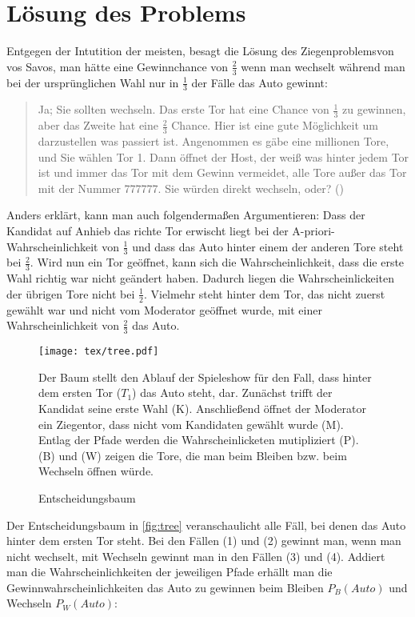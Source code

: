\chapter{Lösung des Problems}

Entgegen der Intutition der meisten, besagt die Lösung des Ziegenproblemsvon vos Savos, man hätte eine Gewinnchance von $\frac{2}{3}$ wenn man wechselt während man bei der ursprünglichen Wahl nur in $\frac{1}{3}$ der Fälle das Auto gewinnt:

\begin{quote}
    Ja; Sie sollten wechseln. Das erste Tor hat eine Chance von $\frac{1}{3}$ zu gewinnen, aber das Zweite hat eine $\frac{2}{3}$ Chance. Hier ist eine gute Möglichkeit um darzustellen was passiert ist. Angenommen es gäbe eine millionen Tore, und Sie wählen Tor 1. Dann öffnet der Host, der weiß was hinter jedem Tor ist und immer das Tor mit dem Gewinn vermeidet, alle Tore außer das Tor mit der Nummer 777777. Sie würden direkt wechseln, oder? (\cite{Savant:1990})
\end{quote}

Anders erklärt, kann man auch folgendermaßen Argumentieren: Dass der Kandidat auf Anhieb das richte Tor erwischt liegt bei der A-priori-Wahrscheinlichkeit von $\frac{1}{3}$ und dass das Auto hinter einem der anderen Tore steht bei $\frac{2}{3}$. Wird nun ein Tor geöffnet, kann sich die Wahrscheinlichkeit, dass die erste Wahl richtig war nicht geändert haben. Dadurch liegen die Wahrscheinlickeiten der übrigen Tore nicht bei $\frac{1}{2}$. Vielmehr steht hinter dem Tor, das nicht zuerst gewählt war und nicht vom Moderator geöffnet wurde, mit einer Wahrscheinlichkeit von $\frac{2}{3}$ das Auto.

\begin{figure}[htbp]
    \centering
    \texttt{[image: tex/tree.pdf]}
    \caption{Entscheidungsbaum}\label{fig:tree}
    \small {Der Baum stellt den Ablauf der Spieleshow für den Fall, dass hinter dem ersten Tor ($T_1$) das Auto steht, dar. Zunächst trifft der Kandidat seine erste Wahl (K). Anschließend öffnet der Moderator ein Ziegentor, dass nicht vom Kandidaten gewählt wurde (M). Entlag der Pfade werden die Wahrscheinlicketen mutipliziert (P). (B) und (W) zeigen die Tore, die man beim Bleiben bzw. beim Wechseln öffnen würde.}
\end{figure}

Der Entscheidungsbaum in \autoref{fig:tree} veranschaulicht alle Fäll, bei denen das Auto hinter dem ersten Tor steht. Bei den Fällen (1) und (2) gewinnt man, wenn man nicht wechselt, mit Wechseln gewinnt man in den Fällen (3) und (4). Addiert man die Wahrscheinlichkeiten der jeweiligen Pfade erhällt man die Gewinnwahrscheinlichkeiten das Auto zu gewinnen beim Bleiben $P_B(Auto)$ und Wechseln $P_W(Auto)$:

